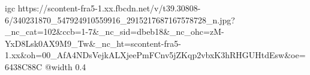 
 
 
 
 

\qqSecCmt


\ifcmt
  igc https://scontent-fra5-1.xx.fbcdn.net/v/t39.30808-6/340231870_547924910559916_2915217687167578728_n.jpg?_nc_cat=102&ccb=1-7&_nc_sid=dbeb18&_nc_ohc=zM-YxD8Lsk0AX9M9_Tw&_nc_ht=scontent-fra5-1.xx&oh=00_AfA4NDsVejkALXjeePmFCnv5jZKqp2vbxK3hRHGUHtdEsw&oe=6438C88C
	@width 0.4
\fi
